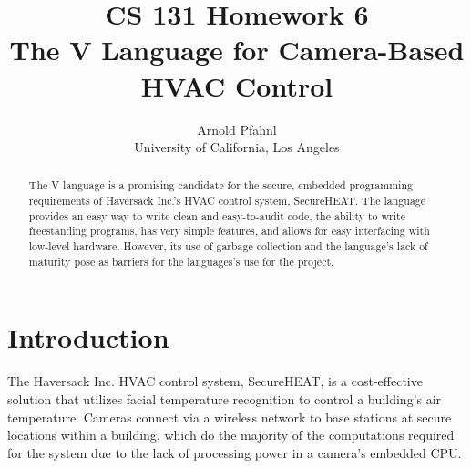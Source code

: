 \documentclass[letterpaper,twocolumn,10pt]{article}
\begin{document}

\date{}

\title{\Large \bf CS 131 Homework 6 \\ The V Language for Camera-Based HVAC Control}

\author{
{\rm Arnold Pfahnl}\\
University of California, Los Angeles
} %

\maketitle

\begin{abstract}
The V language is a promising candidate for the secure, embedded programming requirements of Haversack Inc.'s HVAC control system, SecureHEAT. The language provides an easy way to write clean and easy-to-audit code, the ability to write freestanding programs, has very simple features, and allows for easy interfacing with low-level hardware. However, its use of garbage collection and the language's lack of maturity pose as barriers for the languages's use for the project.
\end{abstract}

\section{Introduction}
The Haversack Inc. HVAC control system, SecureHEAT, is a cost-effective solution that utilizes facial temperature recognition to control a building's air temperature. Cameras connect via a wireless network to base stations at secure locations within a building, which do the majority of the computations required for the system due to the lack of processing power in a camera's embedded CPU. 
\end{document}
